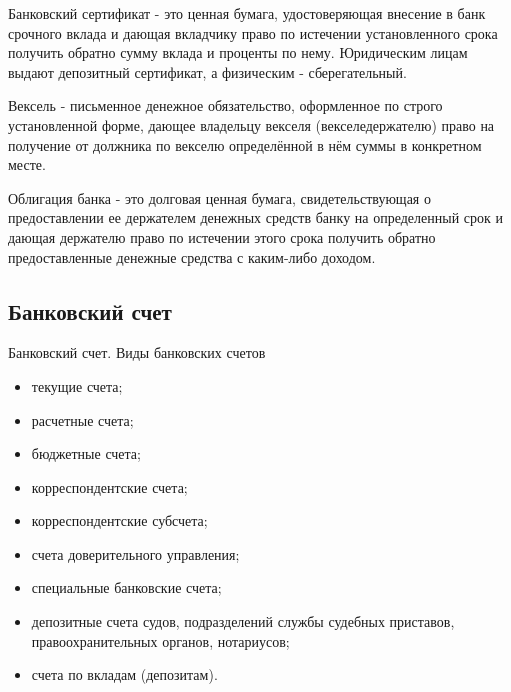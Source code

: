 \documentclass[_Banking_p2.tex]{subfiles}
\begin{document}
\begin{frame}
\begin{block}{Банковский сертификат}
- это ценная бумага, удостоверяющая внесение в банк срочного вклада и дающая вкладчику право по истечении установленного срока получить обратно сумму вклада и проценты по нему. Юридическим лицам выдают депозитный сертификат, а физическим - сберегательный.
\end{block}
\end{frame}

\begin{frame}
\begin{block}{Вексель}
- письменное денежное обязательство, оформленное по строго установленной форме, дающее владельцу векселя (векселедержателю) право на получение от должника по векселю определённой в нём суммы в конкретном месте.
\end{block}
\end{frame}

\begin{frame}
\begin{block}{Облигация банка }
- это долговая ценная бумага, свидетельствующая о предоставлении ее держателем денежных средств банку на определенный срок и дающая держателю право по истечении этого срока получить обратно предоставленные денежные средства с каким-либо доходом.
\end{block}
\end{frame}

\subsection{Банковский счет}
\begin{frame}{Банковский счет. Виды банковских счетов}{}
\begin{itemize}[<+->]
\item
текущие счета; 
\item
расчетные счета; 
\item
бюджетные счета; 
\item
корреспондентские счета; 
\item
корреспондентские субсчета; 
\item
счета доверительного управления; 
\item
специальные банковские счета; 
\item
депозитные счета судов, подразделений службы судебных приставов, правоохранительных органов, нотариусов; 
\item
счета по вкладам (депозитам).
\end{itemize}
\end{frame}
\end{document}
